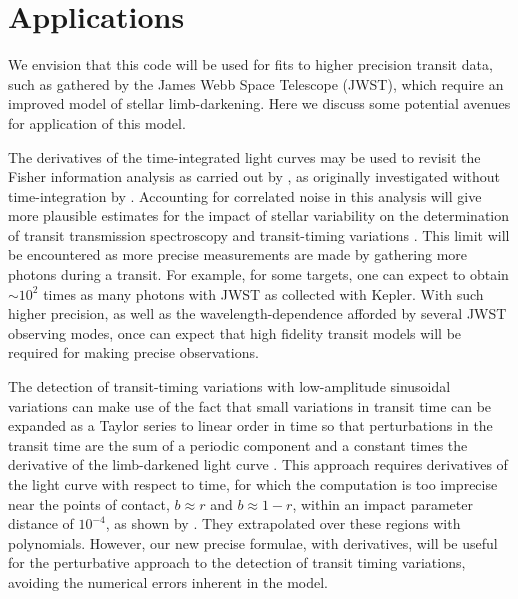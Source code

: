\documentclass[modern]{aastex61}
\begin{document}

\section{Applications}

We envision that this code will be used for fits to higher precision
transit data, such as gathered by the James Webb Space Telescope (JWST), 
which require an improved model of stellar limb-darkening.  Here we discuss 
some potential avenues for application of this model.

The derivatives of the time-integrated light curves may be used to revisit the
Fisher information analysis as carried out by \citet{Price2014}, as originally
investigated without time-integration by \citet{Carter2008}.  Accounting
for correlated noise in this analysis will give more plausible estimates
for the impact of stellar variability on the determination of transit
transmission spectroscopy and transit-timing variations \citep{ForemanMackey2017}.  
This limit will be encountered as more precise measurements are made by gathering 
more photons during a transit.  For example, for some targets, one can expect to 
obtain $\sim 10^2$ times as many photons with JWST as collected with Kepler.
With such higher precision, as well as the wavelength-dependence afforded
by several JWST observing modes, once can expect that high fidelity transit
models will be required for making precise observations.

The detection of transit-timing variations with low-amplitude sinusoidal
variations can make use of the fact that small variations in transit time
can be expanded as a Taylor series to linear order in time so that perturbations
in the transit time are the sum of a periodic component and a constant
times the derivative of the limb-darkened light curve \citep{Ofir2018}.
This approach requires derivatives of the light curve with respect to
time, for which the \citet{MandelAgol2002} computation is too
imprecise near the points of contact, $b \approx r$ and $b \approx 1-r$,
within an impact parameter distance of $10^{-4}$, as shown by \citet{Ofir2018}.
They extrapolated over these regions with polynomials.
However, our new precise formulae, with derivatives, will be useful
for the perturbative approach to the detection of transit timing
variations, avoiding the numerical errors inherent in the \citet{MandelAgol2002}
model.
\end{document}
